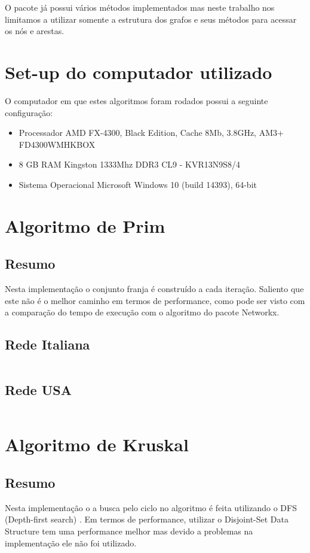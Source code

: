 \documentclass[10pt,a4paper]{report}
\begin{document}
O pacote já possui vários métodos implementados \cite{networkxdocumentation} mas neste trabalho nos limitamos a utilizar somente a estrutura dos grafos e seus métodos para acessar os nós e arestas.



\chapter{Set-up do computador utilizado}
O computador em que estes algoritmos foram rodados possui a seguinte configuração:

\begin{itemize}  
\item Processador AMD FX-4300, Black Edition, Cache 8Mb, 3.8GHz, AM3+ FD4300WMHKBOX
\item 8 GB RAM Kingston 1333Mhz DDR3 CL9 - KVR13N9S8/4
\item Sistema Operacional Microsoft Windows 10 (build 14393), 64-bit
\end{itemize}


\chapter{Algoritmo de Prim}
\section{Resumo}
Nesta implementação o conjunto franja é construído a cada iteração. Saliento que este não é o melhor caminho em termos de performance, como pode ser visto com a comparação do tempo de execução com o algoritmo do pacote Networkx.

\section{Rede Italiana}
\inputminted[fontsize=\small,linenos,tabsize=2,breaklines]{text}{../output/prim_rede_italiana.txt}


\section{Rede USA}
\inputminted[fontsize=\small,linenos,tabsize=2,breaklines]{text}{../output/prim_rede_usa.txt}


\chapter{Algoritmo de Kruskal}
\section{Resumo}
Nesta implementação o a busca pelo ciclo no algoritmo é feita utilizando o DFS (Depth-first search) \cite{dfsalgorithm}. Em termos de performance, utilizar o Disjoint-Set Data Structure \cite{disjointsetalgorithm} tem uma performance melhor mas devido a problemas na implementação ele não foi utilizado.
\end{document}
